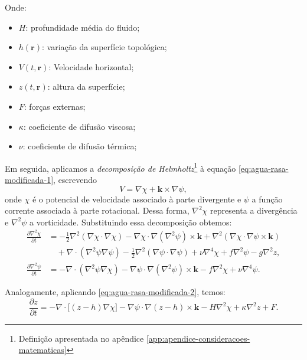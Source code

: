 Onde:
\begin{itemize}
	\item $H$: profundidade média do fluido;
	\item $h(\mathbf{r})$: variação da superfície topológica;
	\item $V(t,\mathbf{r})$: Velocidade horizontal;
	\item $z(t,\mathbf{r})$: altura da superfície;
	\item $F$: forças externas;
	\item $\kappa$: coeficiente de difusão viscosa;
	\item $\nu$: coeficiente de difusão térmica;
\end{itemize}

Em seguida, aplicamos a \textit{decomposição de Helmholtz}\footnote{Definição apresentada no apêndice \ref{app:apendice-consideracoes-matematicas} } à equação \eqref{eq:agua-rasa-modificada-1}, escrevendo
\begin{equation*}
	V = \nabla \chi + \mathbf{k} \times \nabla \psi,
\end{equation*}
onde $\chi$ é o potencial de velocidade associado à parte divergente e $\psi$ a função corrente associada à parte rotacional. Dessa forma, $\nabla^2 \chi$ representa a divergência e $\nabla^2 \psi$ a vorticidade. Substituindo essa decomposição obtemos:
\begin{align}
	\frac{\partial \nabla^2 \chi}{\partial t} & = -\tfrac{1}{2}\nabla^2(\nabla \chi \cdot \nabla \chi) 
	- \nabla \chi \cdot \nabla(\nabla^2\psi) \times \mathbf{k} 
	+ \nabla^2(\nabla \chi \cdot \nabla \psi \times \mathbf{k}) \nonumber \\
	                                          & \quad + \nabla \cdot (\nabla^2\psi\nabla\psi)          
	- \tfrac{1}{2}\nabla^2(\nabla \psi \cdot \nabla \psi) 
	+ \nu\nabla^4\chi + f\nabla^2\psi - g\nabla^2z, \label{eq:equacao-basica-1} \\
	\frac{\partial \nabla^2 \psi}{\partial t} & = -\nabla \cdot (\nabla^2\psi\nabla \chi)              
	- \nabla \psi \cdot \nabla(\nabla^2\psi) \times \mathbf{k} 
	- f\nabla^2\chi + \nu\nabla^4\psi. \label{eq:equacao-basica-2}
\end{align}

Analogamente, aplicando \eqref{eq:agua-rasa-modificada-2}, temos:
\begin{equation}
	\frac{\partial z}{\partial t} 
	= -\nabla \cdot \big[(z - h)\nabla \chi\big] 
	- \nabla \psi \cdot \nabla(z - h) \times \mathbf{k} 
	- H\nabla^2\chi + \kappa\nabla^2z + F. 
	\label{eq:equacao-basica-3}
\end{equation}

